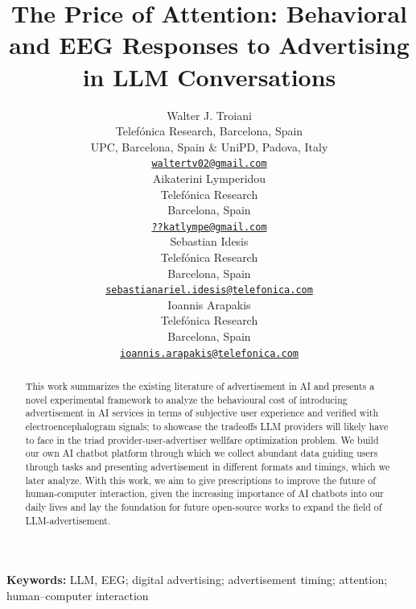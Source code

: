 \documentclass[english]{article}
\title{The Price of Attention: Behavioral and EEG Responses to Advertising in LLM Conversations}
\author{
    Walter J. Troiani \\
    Telefónica Research, Barcelona, Spain \\
    UPC, Barcelona, Spain \& UniPD, Padova, Italy \\
    \href{mailto:waltertv02@gmail.com}{\texttt{waltertv02@gmail.com}} \\
\AND
    Aikaterini Lymperidou \\
    Telefónica Research \\
    Barcelona, Spain \\
    {\scriptsize\href{mailto:katlympe@gmail.com}{\texttt{??katlympe@gmail.com}}} \\
\And
    Sebastian Idesis \\
    Telefónica Research \\
    Barcelona, Spain \\
    {\scriptsize\href{mailto:sebastianariel.idesis@telefonica.com}{\texttt{sebastianariel.idesis@telefonica.com}}} \\
\And
    Ioannis Arapakis \\
    Telefónica Research \\
    Barcelona, Spain \\
    {\scriptsize\href{mailto:ioannis.arapakis@telefonica.com}{\texttt{ioannis.arapakis@telefonica.com}}} \\
}
\date{}
\begin{document}
\maketitle

\begingroup
\renewcommand{\thefootnote}{}
\addtocounter{footnote}{-1}
\endgroup


\begin{abstract}
This work summarizes the existing literature of advertisement in AI and presents a novel experimental framework to analyze the behavioural cost of introducing advertisement in AI services in terms of
subjective user experience and verified with electroencephalogram signals; to showcase the tradeoffs LLM providers will likely have to face in the triad provider-user-advertiser wellfare optimization problem. We build our own AI chatbot platform
through which we collect abundant data guiding users through tasks and presenting advertisement in different formats and timings, which we later analyze.
With this work, we aim to give prescriptions to improve the future of human-computer interaction, given the increasing importance of AI chatbots into our daily lives and lay the foundation for future open-source works to expand the field of LLM-advertisement.
\end{abstract}

\noindent\textbf{Keywords:}
LLM, EEG; digital advertising; advertisement timing; attention; human--computer interaction

\clearpage
\tableofcontents
\clearpage


\end{document}
